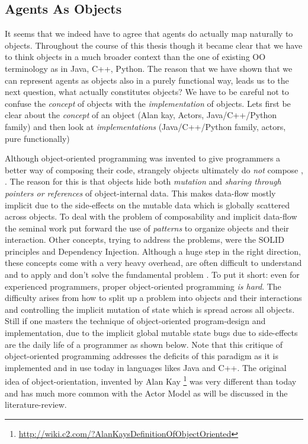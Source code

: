 \subsection{Agents As Objects}
It seems that we indeed have to agree that agents do actually map naturally to objects. Throughout the course of this thesis though it became clear that we have to think objects in a much broader context than the one of existing OO terminology as in Java, C++, Python. The reason that we have shown that we can represent agents as objects also in a purely functional way, leads us to the next question, what actually constitutes objects? We have to be careful not to confuse the \textit{concept} of objects with the \textit{implementation} of objects. Lets first be clear about the \textit{concept} of an object (Alan kay, Actors, Java/C++/Python family) and then look at \textit{implementations} (Java/C++/Python family, actors, pure functionally)


Although object-oriented programming was invented to give programmers a better way of composing their code, strangely objects ultimately do \textit{not} compose \cite{bill_what_2017}, \cite{erkki_lindpere_why_2013}. The reason for this is that objects hide both \textit{mutation} and \textit{sharing through pointers or references} of object-internal data. This makes data-flow mostly implicit due to the side-effects on the mutable data which is globally scattered across objects. To deal with the problem of composability and implicit data-flow the seminal work \cite{gamma_design_1994} put forward the use of \textit{patterns} to organize objects and their interaction. Other concepts, trying to address the problems, were the SOLID principles and Dependency Injection. Although a huge step in the right direction, these concepts come with a very heavy overhead, are often difficult to understand and to apply and don't solve the fundamental problem \cite{lawrence_krubner_object_2014}. To put it short: even for experienced programmers, proper object-oriented programming \textit{is hard}. The difficulty arises from how to split up a problem into objects and their interactions and controlling the implicit mutation of state which is spread across all objects. Still if one masters the technique of object-oriented program-design and implementation, due to the implicit global mutable state bugs due to side-effects are the daily life of a programmer as shown below. Note that this critique of object-oriented programming addresses the deficits of this paradigm as it is implemented and in use today in languages likes Java and C++. The original idea of object-orientation, invented by Alan Kay \footnote{\url{http://wiki.c2.com/?AlanKaysDefinitionOfObjectOriented}} was very different than today and has much more common with the Actor Model as will be discussed in the literature-review.


